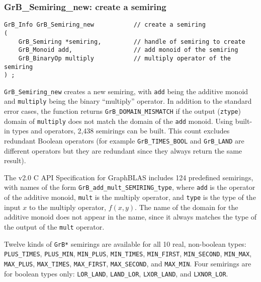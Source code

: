 \documentclass[12pt]{article}
\begin{document}
\subsubsection{{\sf GrB\_Semiring\_new:} create a semiring}
\label{semiring_new}

\begin{mdframed}[userdefinedwidth=6in]
{\footnotesize
\begin{verbatim}
GrB_Info GrB_Semiring_new           // create a semiring
(
    GrB_Semiring *semiring,         // handle of semiring to create
    GrB_Monoid add,                 // add monoid of the semiring
    GrB_BinaryOp multiply           // multiply operator of the semiring
) ;
\end{verbatim}
} \end{mdframed}

\verb'GrB_Semiring_new' creates a new semiring, with \verb'add' being the
additive monoid and \verb'multiply' being the binary ``multiply'' operator.  In
addition to the standard error cases, the function returns
\verb'GrB_DOMAIN_MISMATCH' if the output (\verb'ztype') domain of
\verb'multiply' does not match the domain of the \verb'add' monoid.  Using
built-in types and operators, 2,438 semirings can be built.  This count
excludes redundant Boolean operators (for example \verb'GrB_TIMES_BOOL' and
\verb'GrB_LAND' are different operators but they are redundant since they
always return the same result).

The v2.0 C API Specification for GraphBLAS includes 124 predefined semirings,
with names of the form \verb'GrB_add_mult_SEMIRING_type', where \verb'add' is
the operator of the additive monoid, \verb'mult' is the multiply operator, and
\verb'type' is the type of the input $x$ to the multiply operator, $f(x,y)$.
The name of the domain for the additive monoid does not appear in the name,
since it always matches the type of the output of the \verb'mult' operator.

Twelve kinds of \verb'GrB*' semirings are available for all 10 real, non-boolean types:
    \verb'PLUS_TIMES', \verb'PLUS_MIN',
    \verb'MIN_PLUS', \verb'MIN_TIMES', \verb'MIN_FIRST', \verb'MIN_SECOND', \verb'MIN_MAX',
    \verb'MAX_PLUS', \verb'MAX_TIMES', \verb'MAX_FIRST', \verb'MAX_SECOND', and \verb'MAX_MIN'.
Four semirings are for boolean types only: 
    \verb'LOR_LAND', \verb'LAND_LOR', \verb'LXOR_LAND', and \verb'LXNOR_LOR'.
\end{document}

